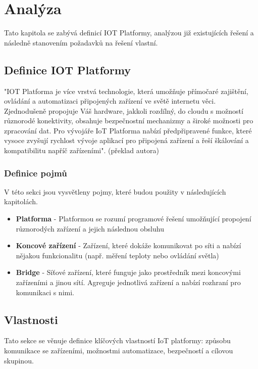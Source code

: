 \chapter{Analýza}
Tato kapitola se zabývá definicí IOT Platformy, analýzou již existujících řešení a následně stanovením požadavků na řešení vlastní.


\section{Definice IOT Platformy}
"IOT Platforma je více vrstvá technologie, která umožňuje přímočaré zajištění, ovládání a automatizaci připojených zařízení ve světě internetu věci. Zjednodušeně propojuje Váš hardware, jakkoli rozdílný, do cloudu s možností různorodé konektivity, obsahuje bezpečnostní mechanizmy a široké možnosti pro zpracování dat. Pro vývojáře IoT Platforma nabízí předpřipravené funkce, které vysoce zvyšují rychlost vývoje aplikací pro připojená zařízení a řeší škálování a kompatibilitu napříč zařízeními". (překlad autora) \cite{kaaproject}

\subsection{Definice pojmů}
V této sekci jsou vysvětleny pojmy, které budou použity v následujících kapitolách.

\begin{itemize}
    \item \textbf{Platforma} - Platformou se rozumí programové řešení umožňující propojení různorodých zařízení a jejich následnou obsluhu
    \item \textbf{Koncové zařízení} - Zařízení, které dokáže komunikovat po síti a nabízí nějakou funkcionalitu (např. měření teploty nebo ovládání světla)
    \item \textbf{Bridge} - Síťové zařízení, které funguje jako prostředník mezi koncovými zařízeními a jinou sítí. Agreguje jednotlivá zařízení a nabízí rozhraní pro komunikaci s nimi.
\end{itemize}


\section{Vlastnosti}
Tato sekce se věnuje definice klíčových vlastností IoT platformy: způsobu komunikace se zařízeními, možnostmi automatizace, bezpečností a cílovou skupinou.

